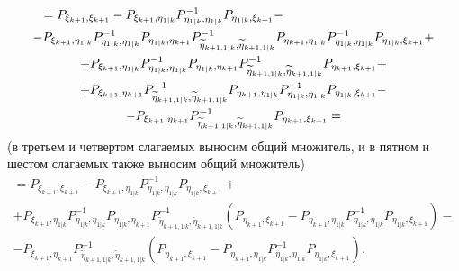 \begin{multline*}
	\shoveleft{ = P_{\xi_{k+1}, \xi_{k+1}} - P_{\xi_{k+1}, \eta_{1|k}} P_{\eta_{1|k},\eta_{1|k}}^{-1} P_{\eta_{1|k}, \xi_{k+1}} - } \\
	- P_{\xi_{k+1}, \eta_{1|k}} P_{\eta_{1|k},\eta_{1|k}}^{-1} P_{\eta_{1|k}, \eta_{k+1}} P_{\widetilde{\eta}_{k+1, 1|k}, \widetilde{\eta}_{k+1, 1|k}}^{-1} P_{\eta_{k+1}, \eta_{1|k}} P_{\eta_{1|k},\eta_{1|k}}^{-1} P_{\eta_{1|k}, \xi_{k+1}} + \\
	+ P_{\xi_{k+1}, \eta_{1|k}} P_{\eta_{1|k},\eta_{1|k}}^{-1} P_{\eta_{1|k}, \eta_{k+1}} P_{\widetilde{\eta}_{k+1, 1|k}, \widetilde{\eta}_{k+1, 1|k}}^{-1} P_{\eta_{k+1}, \xi_{k+1}} + \\
	+ P_{\xi_{k+1}, \eta_{k+1}} P_{\widetilde{\eta}_{k+1, 1|k}, \widetilde{\eta}_{k+1, 1|k}}^{-1} P_{\eta_{k+1}, \eta_{1|k}} P_{\eta_{1|k},\eta_{1|k}}^{-1} P_{\eta_{1|k}, \xi_{k+1}} - \\
	- P_{\xi_{k+1}, \eta_{k+1}} P_{\widetilde{\eta}_{k+1, 1|k}, \widetilde{\eta}_{k+1, 1|k}}^{-1} P_{\eta_{k+1}, \xi_{k+1}} =
\end{multline*}
(в третьем и четвертом слагаемых выносим общий множитель, и в пятном и шестом слагаемых также выносим общий множитель)
\begin{multline*}
	= P_{\xi_{k+1}, \xi_{k+1}} - P_{\xi_{k+1}, \eta_{1|k}} P_{\eta_{1|k},\eta_{1|k}}^{-1} P_{\eta_{1|k}, \xi_{k+1}} + \\
	+ P_{\xi_{k+1}, \eta_{1|k}} P_{\eta_{1|k},\eta_{1|k}}^{-1} P_{\eta_{1|k}, \eta_{k+1}} P_{\widetilde{\eta}_{k+1, 1|k}, \widetilde{\eta}_{k+1, 1|k}}^{-1} \left ( P_{\eta_{k+1}, \xi_{k+1}} - P_{\eta_{k+1}, \eta_{1|k}} P_{\eta_{1|k},\eta_{1|k}}^{-1} P_{\eta_{1|k}, \xi_{k+1}} \right ) - \\
	- P_{\xi_{k+1}, \eta_{k+1}} P_{\widetilde{\eta}_{k+1, 1|k}, \widetilde{\eta}_{k+1, 1|k}}^{-1} \left ( P_{\eta_{k+1}, \xi_{k+1}} - P_{\eta_{k+1}, \eta_{1|k}} P_{\eta_{1|k},\eta_{1|k}}^{-1} P_{\eta_{1|k}, \xi_{k+1}} \right )
	.
\end{multline*}


